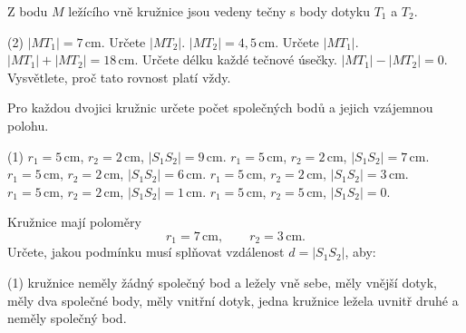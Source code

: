 \documentclass[12pt,a4paper]{article}
\begin{document}

\begin{exercise}

    Z bodu $M$ ležícího vně kružnice jsou vedeny tečny s body dotyku $T_1$ a $T_2$.

    \begin{tasks}(2)
        \task $|MT_1|=7\,\mathrm{cm}$. Určete $|MT_2|$.
        \task $|MT_2|=4{,}5\,\mathrm{cm}$. Určete $|MT_1|$.
        \task $|MT_1|+|MT_2|=18\,\mathrm{cm}$. Určete délku každé tečnové úsečky.
        \task $|MT_1|-|MT_2|=0$. Vysvětlete, proč tato rovnost platí vždy.
    \end{tasks}

\end{exercise}



\begin{exercise}

    Pro každou dvojici kružnic určete počet společných bodů a jejich vzájemnou polohu.

    \begin{tasks}(1)
        \task $r_1=5\,\mathrm{cm}$, $r_2=2\,\mathrm{cm}$, $|S_1S_2|=9\,\mathrm{cm}$.
        \task $r_1=5\,\mathrm{cm}$, $r_2=2\,\mathrm{cm}$, $|S_1S_2|=7\,\mathrm{cm}$.
        \task $r_1=5\,\mathrm{cm}$, $r_2=2\,\mathrm{cm}$, $|S_1S_2|=6\,\mathrm{cm}$.
        \task $r_1=5\,\mathrm{cm}$, $r_2=2\,\mathrm{cm}$, $|S_1S_2|=3\,\mathrm{cm}$.
        \task $r_1=5\,\mathrm{cm}$, $r_2=2\,\mathrm{cm}$, $|S_1S_2|=1\,\mathrm{cm}$.
        \task $r_1=5\,\mathrm{cm}$, $r_2=5\,\mathrm{cm}$, $|S_1S_2|=0$.
    \end{tasks}

\end{exercise}



\begin{exercise}

    Kružnice mají poloměry
    \[
        r_1=7\,\mathrm{cm},
        \qquad
        r_2=3\,\mathrm{cm}.
    \]
    Určete, jakou podmínku musí splňovat vzdálenost $d=|S_1S_2|$, aby:

    \begin{tasks}(1)
        \task kružnice neměly žádný společný bod a ležely vně sebe,
        \task měly vnější dotyk,
        \task měly dva společné body,
        \task měly vnitřní dotyk,
        \task jedna kružnice ležela uvnitř druhé a neměly společný bod.
    \end{tasks}

\end{exercise}
\end{document}
